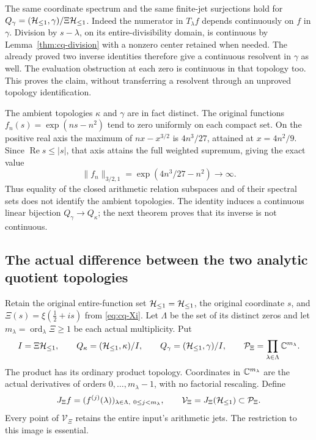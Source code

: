 The same coordinate spectrum and the same finite-jet surjections hold
for $Q_\gamma=(\mathcal H_{\leq 1},\gamma)/\Xi\mathcal H_{\leq 1}$. Indeed the numerator in
$T_\lambda f$ depends continuously on $f$ in $\gamma$. Division
by $s-\lambda$, on its entire-divisibility domain, is continuous by
Lemma~\ref{thm:cq-division} with a nonzero center retained when
needed. The already proved two inverse identities therefore give a
continuous resolvent in $\gamma$ as well. The evaluation obstruction
at each zero is continuous in that topology too. This proves the
claim, without transferring a resolvent through an unproved topology
identification.

The ambient topologies $\kappa$ and $\gamma$ are in fact distinct.
The original functions $f_n(s)=\exp(ns-n^2)$ tend to zero uniformly
on each compact set. On the positive real axis the maximum of
$nx-x^{3/2}$ is $4n^3/27$, attained at $x=4n^2/9$. Since
$\operatorname{Re}s\leq|s|$, that axis attains the full weighted
supremum, giving the exact value
\[
 \|f_n\|_{3/2,1}=\exp(4n^3/27-n^2)\longrightarrow\infty.
\]
Thus equality of the closed arithmetic relation subspaces and of
their spectral sets does not identify the ambient topologies. The
identity induces a continuous linear bijection $Q_\gamma\to Q_\kappa$;
the next theorem proves that its inverse is not continuous.


\subsection{The actual difference between the two analytic quotient topologies}
\label{sec:cq-quotient-topologies}
Retain the original entire-function set $\mathcal H_{\leq 1}=\mathcal H_{\leq1}$,
the original coordinate $s$, and
$\Xi(s)=\xi(\tfrac12+is)$ from \eqref{eq:cq-Xi}.
Let $\Lambda$ be the set of its distinct zeros and let
$m_\lambda=\operatorname{ord}_\lambda\Xi\geq1$ be each actual
multiplicity. Put
\[
 I=\Xi\mathcal H_{\leq 1},\qquad
 Q_\kappa=(\mathcal H_{\leq 1},\kappa)/I,\qquad
 Q_\gamma=(\mathcal H_{\leq 1},\gamma)/I,\qquad
 \mathcal P_\Xi=\prod_{\lambda\in\Lambda}\mathbb C^{m_\lambda}.
\]
The product has its ordinary product topology. Coordinates in
$\mathbb C^{m_\lambda}$ are the actual derivatives of orders
$0,\ldots,m_\lambda-1$, with no factorial rescaling. Define
\begin{equation}\label{eq:cq-total-jet-map}
 J_\Xi f=(f^{(j)}(\lambda))_{
          \lambda\in\Lambda,\ 0\leq j<m_\lambda},
 \qquad \mathcal V_\Xi=J_\Xi(\mathcal H_{\leq 1})\subset\mathcal P_\Xi.
\end{equation}
Every point of $\mathcal V_\Xi$ retains the entire input's arithmetic
jets. The restriction to this image is essential.

